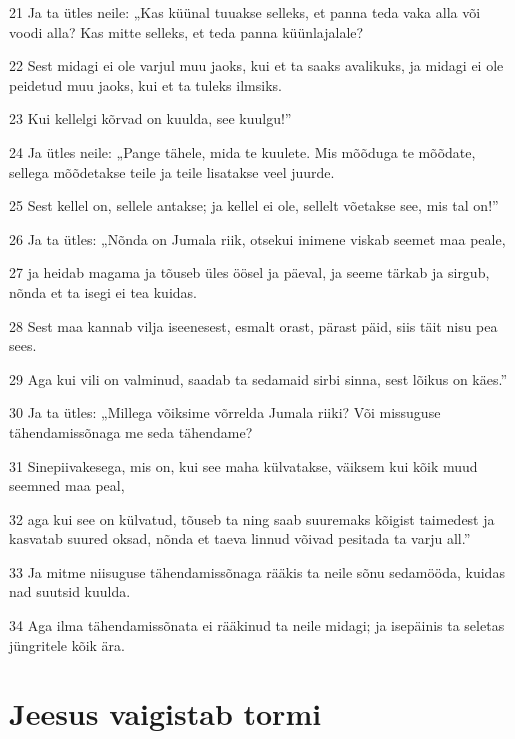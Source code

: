 \par 21 Ja ta ütles neile: „Kas küünal tuuakse selleks, et panna teda vaka alla või voodi alla? Kas mitte selleks, et teda panna küünlajalale?
\par 22 Sest midagi ei ole varjul muu jaoks, kui et ta saaks avalikuks, ja midagi ei ole peidetud muu jaoks, kui et ta tuleks ilmsiks.
\par 23 Kui kellelgi kõrvad on kuulda, see kuulgu!”
\par 24 Ja ütles neile: „Pange tähele, mida te kuulete. Mis mõõduga te mõõdate, sellega mõõdetakse teile ja teile lisatakse veel juurde.
\par 25 Sest kellel on, sellele antakse; ja kellel ei ole, sellelt võetakse see, mis tal on!”
\par 26 Ja ta ütles: „Nõnda on Jumala riik, otsekui inimene viskab seemet maa peale,
\par 27 ja heidab magama ja tõuseb üles öösel ja päeval, ja seeme tärkab ja sirgub, nõnda et ta isegi ei tea kuidas.
\par 28 Sest maa kannab vilja iseenesest, esmalt orast, pärast päid, siis täit nisu pea sees.
\par 29 Aga kui vili on valminud, saadab ta sedamaid sirbi sinna, sest lõikus on käes.”
\par 30 Ja ta ütles: „Millega võiksime võrrelda Jumala riiki? Või missuguse tähendamissõnaga me seda tähendame?
\par 31 Sinepiivakesega, mis on, kui see maha külvatakse, väiksem kui kõik muud seemned maa peal,
\par 32 aga kui see on külvatud, tõuseb ta ning saab suuremaks kõigist taimedest ja kasvatab suured oksad, nõnda et taeva linnud võivad pesitada ta varju all.”
\par 33 Ja mitme niisuguse tähendamissõnaga rääkis ta neile sõnu sedamööda, kuidas nad suutsid kuulda.
\par 34 Aga ilma tähendamissõnata ei rääkinud ta neile midagi; ja isepäinis ta seletas jüngritele kõik ära.

\section*{Jeesus vaigistab tormi}

